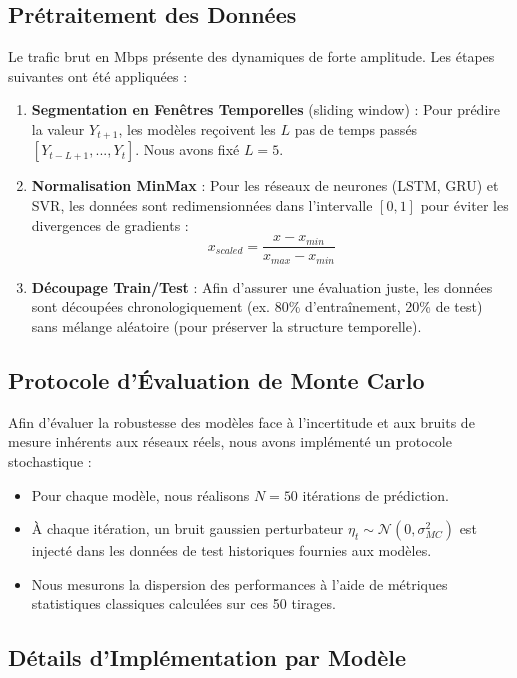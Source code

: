 \documentclass[11pt,a4paper]{article}
\begin{document}
\subsection{Prétraitement des Données}
Le trafic brut en Mbps présente des dynamiques de forte amplitude. Les étapes suivantes ont été appliquées :
\begin{enumerate}
    \item \textbf{Segmentation en Fenêtres Temporelles} (sliding window) : Pour prédire la valeur $Y_{t+1}$, les modèles reçoivent les $L$ pas de temps passés $[Y_{t-L+1}, ..., Y_t]$. Nous avons fixé $L = 5$.
    \item \textbf{Normalisation MinMax} : Pour les réseaux de neurones (LSTM, GRU) et SVR, les données sont redimensionnées dans l'intervalle $[0, 1]$ pour éviter les divergences de gradients :
    \begin{equation}
        x_{scaled} = \frac{x - x_{min}}{x_{max} - x_{min}}
    \end{equation}
    \item \textbf{Découpage Train/Test} : Afin d'assurer une évaluation juste, les données sont découpées chronologiquement (ex. 80\% d'entraînement, 20\% de test) sans mélange aléatoire (pour préserver la structure temporelle).
\end{enumerate}

\subsection{Protocole d'Évaluation de Monte Carlo}
Afin d'évaluer la robustesse des modèles face à l'incertitude et aux bruits de mesure inhérents aux réseaux réels, nous avons implémenté un protocole stochastique :
\begin{itemize}
    \item Pour chaque modèle, nous réalisons $N = 50$ itérations de prédiction.
    \item À chaque itération, un bruit gaussien perturbateur $\eta_t \sim \mathcal{N}(0, \sigma^2_{MC})$ est injecté dans les données de test historiques fournies aux modèles.
    \item Nous mesurons la dispersion des performances à l'aide de métriques statistiques classiques calculées sur ces 50 tirages.
\end{itemize}

\subsection{Détails d'Implémentation par Modèle}
\end{document}
